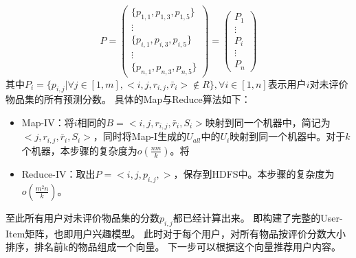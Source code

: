 \begin{equation}
P=\left(
\begin{array}{c}
 \{ p_{1,1},p_{1,3},p_{1,5} \} \\
\vdots \\
\{ p_{i,1},p_{i,3},p_{i,5} \} \\
\vdots \\
\{p_{n,1},p_{n,3},p_{n,5}\}
\end{array}
\right) = \left(
\begin{array}{c}
P_1 \\
\vdots\\
P_i\\
\vdots \\
P_n
\end{array}
\right)
\end{equation}
其中$P_i=\{p_{i,j}|\forall j\in [1,m],<i,j,r_{i,j},\bar{r}_i>\notin R\},\forall i\in[1,n]$表示用户$i$对未评价物品集的所有预测分数。
具体的Map与Reduce算法如下：
\begin{itemize}
\item Map-IV：将$i$相同的$B=<i,j,r_{i,j},\bar{r}_i ,S_i>$映射到同一个机器中，简记为$<j,r_{i,j},\bar{r}_i ,S_i>$，同时将Map-I生成的$U_{all}$中的$U_i$映射到同一个机器中。对于$k$个机器，本步骤的复杂度为$o(\frac{nm}{k})$。将
\item Reduce-IV：取出$P=<i,j,p_{i,j},>$，保存到HDFS中。本步骤的复杂度为$o(\frac{m^2n}{k})$。
\end{itemize}
至此所有用户对未评价物品集的分数$p_{i,j}$都已经计算出来。
即构建了完整的User-Item矩阵，也即用户兴趣模型。
此时对于每个用户，对所有物品按评价分数大小排序，排名前k的物品组成一个向量。
下一步可以根据这个向量推荐用户内容。






